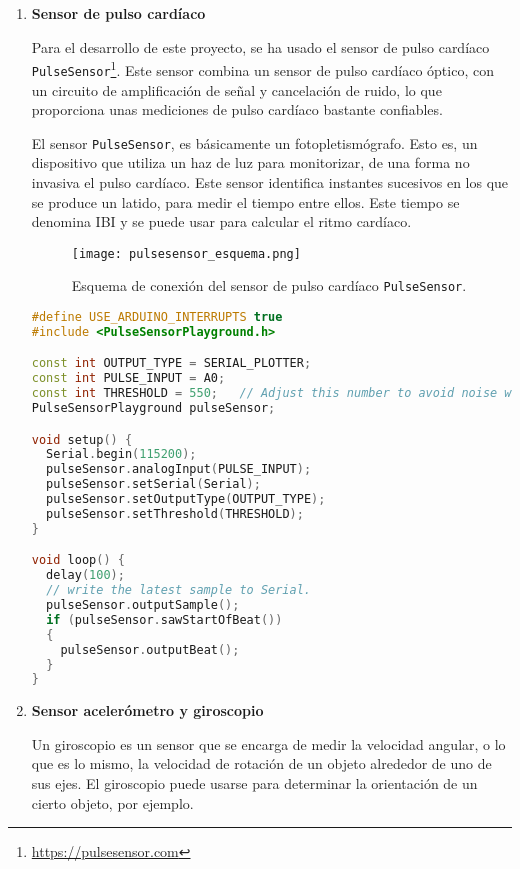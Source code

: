 \begin{enumerate}
\item \textbf{Sensor de pulso cardíaco}

Para el desarrollo de este proyecto, se ha usado el sensor de pulso cardíaco \texttt{PulseSensor}\footnote{\url{https://pulsesensor.com}}. Este sensor combina un sensor de pulso cardíaco óptico, con un circuito de amplificación de señal y cancelación de ruido, lo que proporciona unas mediciones de pulso cardíaco bastante confiables. 

El sensor \texttt{PulseSensor}, es básicamente un fotopletismógrafo. Esto es, un dispositivo que utiliza un haz de luz para monitorizar, de una forma no invasiva el pulso cardíaco. Este sensor identifica instantes sucesivos en los que se produce un latido, para medir el tiempo entre ellos. Este tiempo se denomina \ac{IBI} y se puede usar para calcular el ritmo cardíaco.

\begin{figure}[!h]
\begin{center}
\texttt{[image: pulsesensor\_esquema.png]}
\caption{Esquema de conexión del sensor de pulso cardíaco \texttt{PulseSensor}.}
\label{fig:pulsesensor}
\end{center}
\end{figure}

\begin{lstlisting}[language=c++,captionpos=t,caption={\textbf{Utilización básica del sensor de pulso cardíaco.}},label={lst:basicPulsesensor}]
#define USE_ARDUINO_INTERRUPTS true
#include <PulseSensorPlayground.h>

const int OUTPUT_TYPE = SERIAL_PLOTTER;
const int PULSE_INPUT = A0;
const int THRESHOLD = 550;   // Adjust this number to avoid noise when idle
PulseSensorPlayground pulseSensor;

void setup() {
  Serial.begin(115200);
  pulseSensor.analogInput(PULSE_INPUT);
  pulseSensor.setSerial(Serial);
  pulseSensor.setOutputType(OUTPUT_TYPE);
  pulseSensor.setThreshold(THRESHOLD);
}

void loop() {
  delay(100);
  // write the latest sample to Serial.
  pulseSensor.outputSample();
  if (pulseSensor.sawStartOfBeat()) 
  {
    pulseSensor.outputBeat();
  }
}
\end{lstlisting}

\item \textbf{Sensor acelerómetro y giroscopio}

Un giroscopio es un sensor que se encarga de medir la velocidad angular, o lo que es lo mismo, la velocidad de rotación de un objeto alrededor de uno de sus ejes. El giroscopio puede usarse para determinar la orientación de un cierto objeto, por ejemplo.


\end{enumerate}

